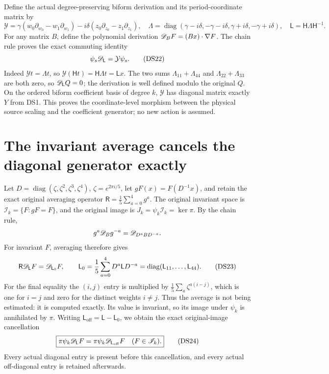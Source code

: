 Define the actual degree-preserving biform derivation and its
period-coordinate matrix by
\begin{equation}\label{dsroot:eq:generator}
\mathcal Y=\gamma(w_0\partial_{w_0}-w_1\partial_{w_1})
-i\delta(z_0\partial_{z_0}-z_1\partial_{z_1}),\quad
\Lambda=\operatorname{diag}(\gamma-i\delta,-\gamma-i\delta,
\gamma+i\delta,-\gamma+i\delta),\quad
\mathsf L=\mathsf H\Lambda\mathsf H^{-1}.
\tag{DS21}
\end{equation}
For any matrix \(B\), define the polynomial derivation
\(\mathscr D_BF=(Bx)\cdot\nabla F\). The chain rule proves the exact
commuting identity
\begin{equation}\label{dsroot:eq:generator-map}
\psi_s\mathscr D_{\mathsf L}=\mathcal Y\psi_s.
\tag{DS22}
\end{equation}
Indeed \(\mathcal Yt=\Lambda t\), so
\(\mathcal Y(\mathsf Ht)=\mathsf H\Lambda t=\mathsf Lx\).
The two sums \(\Lambda_{11}+\Lambda_{44}\) and
\(\Lambda_{22}+\Lambda_{33}\) are both zero, so
\(\mathscr D_{\mathsf L}Q=0\); the derivation is well defined modulo
the original \(Q\). On the ordered biform coefficient basis of degree
\(k\), \(\mathcal Y\) has diagonal matrix exactly \(Y\) from DS1.
This proves the coordinate-level morphism between the physical source
scaling and the coefficient generator; no new action is assumed.

\section{The invariant average cancels the diagonal generator exactly}

Let \(D=\operatorname{diag}(\zeta,\zeta^2,\zeta^3,\zeta^4)\),
\(\zeta=e^{2\pi i/5}\), let \(gF(x)=F(D^{-1}x)\), and retain
the exact original averaging operator
\(\mathsf R=\tfrac15\sum_{a=0}^4g^a\).
The original invariant space is \(\mathscr I_k=\{F:gF=F\}\), and
the original image is \(J_k=\psi_k\mathscr I_k=\ker\pi\).
By the chain rule,
\[
g^a\mathscr D_Bg^{-a}=\mathscr D_{D^aBD^{-a}}.
\]
For invariant \(F\), averaging therefore gives
\begin{equation}\label{dsroot:eq:reynolds}
\mathsf R\mathscr D_{\mathsf L}F=\mathscr D_{\mathsf L_0}F,
\qquad
\mathsf L_0=\frac15\sum_{a=0}^4D^a\mathsf LD^{-a}
=\operatorname{diag}(\mathsf L_{11},\ldots,\mathsf L_{44}).
\tag{DS23}
\end{equation}
For the final equality the \((i,j)\) entry is multiplied by
\(\tfrac15\sum_a\zeta^{a(i-j)}\), which is one for \(i=j\)
and zero for the distinct weights \(i\ne j\). Thus the average is
not being estimated: it is computed exactly. Its value is invariant,
so its image under \(\psi_k\) is annihilated by \(\pi\).
Writing \(\mathsf L_{\mathrm{off}}=\mathsf L-\mathsf L_0\), we obtain
the exact original-image cancellation
\begin{equation}\label{dsroot:eq:offdiag-cancellation}
\boxed{\pi\psi_k\mathscr D_{\mathsf L}F
=\pi\psi_k\mathscr D_{\mathsf L_{\mathrm{off}}}F
\quad(F\in\mathscr I_k).}
\tag{DS24}
\end{equation}
Every actual diagonal entry is present before this cancellation, and
every actual off-diagonal entry is retained afterwards.

